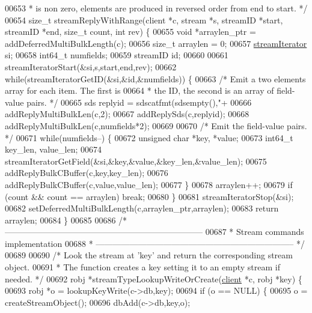 \begin{DoxyCode}
{00653 \textcolor{comment}{ * is non zero, elements are produced in reversed order from end to start. */}
00654 size\_t streamReplyWithRange(client *c, stream *s, streamID *start, streamID *end, size\_t count, \textcolor{keywordtype}{int} 
      rev) \{
00655     \textcolor{keywordtype}{void} *arraylen\_ptr = addDeferredMultiBulkLength(c);
00656     size\_t arraylen = 0;
00657     \hyperlink{structstreamIterator}{streamIterator} si;
00658     int64\_t numfields;
00659     streamID id;
00660 
00661     streamIteratorStart(&si,s,start,end,rev);
00662     \textcolor{keywordflow}{while}(streamIteratorGetID(&si,&id,&numfields)) \{
00663         \textcolor{comment}{/* Emit a two elements array for each item. The first is}
00664 \textcolor{comment}{         * the ID, the second is an array of field-value pairs. */}
00665         sds replyid = sdscatfmt(sdsempty(),\textcolor{stringliteral}{"+%
00666         addReplyMultiBulkLen(c,2);
00667         addReplySds(c,replyid);
00668         addReplyMultiBulkLen(c,numfields*2);
00669 
00670         \textcolor{comment}{/* Emit the field-value pairs. */}
00671         \textcolor{keywordflow}{while}(numfields--) \{
00672             \textcolor{keywordtype}{unsigned} \textcolor{keywordtype}{char} *key, *value;
00673             int64\_t key\_len, value\_len;
00674             streamIteratorGetField(&si,&key,&value,&key\_len,&value\_len);
00675             addReplyBulkCBuffer(c,key,key\_len);
00676             addReplyBulkCBuffer(c,value,value\_len);
00677         \}
00678         arraylen++;
00679         \textcolor{keywordflow}{if} (count && count == arraylen) \textcolor{keywordflow}{break};
00680     \}
00681     streamIteratorStop(&si);
00682     setDeferredMultiBulkLength(c,arraylen\_ptr,arraylen);
00683     \textcolor{keywordflow}{return} arraylen;
00684 \}
00685 
00686 \textcolor{comment}{/* -----------------------------------------------------------------------}
00687 \textcolor{comment}{ * Stream commands implementation}
00688 \textcolor{comment}{ * ----------------------------------------------------------------------- */}
00689 
00690 \textcolor{comment}{/* Look the stream at 'key' and return the corresponding stream object.}
00691 \textcolor{comment}{ * The function creates a key setting it to an empty stream if needed. */}
00692 robj *streamTypeLookupWriteOrCreate(\hyperlink{structclient}{client} *c, robj *key) \{
00693     robj *o = lookupKeyWrite(c->db,key);
00694     \textcolor{keywordflow}{if} (o == NULL) \{
00695         o = createStreamObject();
00696         dbAdd(c->db,key,o);
}}
\end{DoxyCode}
